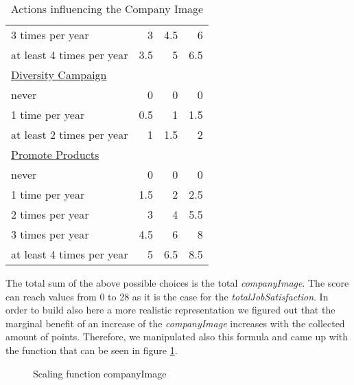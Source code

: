 \begin{table}[]
\begin{tabular}{|l|r|r|r|}
3 times per year                  & 3    & 4.5    & 6 \\
at least 4 times per year         & 3.5  & 5      & 6.5  \\
\underline{Diversity Campaign}    & & & \\
never                             & 0    & 0      & 0 \\
1 time per year                   & 0.5  & 1      & 1.5  \\
at least 2 times per year         & 1    & 1.5    & 2 \\
\underline{Promote Products} & & & \\
never                             & 0    & 0      & 0 \\
1 time per year                   & 1.5  & 2      & 2.5  \\
2 times per year                  & 3    & 4      & 5.5  \\
3 times per year                  & 4.5  & 6      & 8 \\
at least 4 times per year         & 5    & 6.5    & 8.5  \\
\hline
\end{tabular}
\caption{Actions influencing the Company Image}
\label{calculation_CI}
\end{table}

The total sum of the above possible choices is the total \textit{companyImage}. The score can reach values from 0 to 28 as it is the case for the \textit{totalJobSatisfaction}. In order to build also here a more realistic representation we figured out that the marginal benefit of an increase of the \textit{companyImage} increases with the collected amount of points. Therefore, we manipulated also this formula and came up with the function that can be seen in figure \ref{fig:scaling}.

\begin{figure}[H]
    \centering
    \caption{Scaling function companyImage}
    \label{fig:scaling}
\end{figure}

